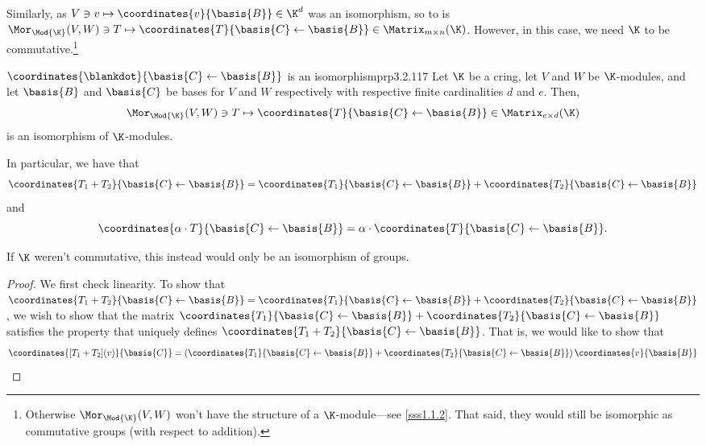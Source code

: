 Similarly, as $V\ni v\mapsto \coordinates{v}{\basis{B}}\in \K ^d$ was an isomorphism, so to is $\Mor _{\Mod{\K}}(V,W)\ni T\mapsto \coordinates{T}{\basis{C}\leftarrow \basis{B}}\in \Matrix _{m\times n}(\K )$.  However, in this case, we need $\K$ to be commutative.\footnote{Otherwise $\Mor _{\Mod{\K}}(V,W)$ won't have the structure of a $\K$-module---see \cref{sss1.1.2}.  That said, they would still be isomorphic as commutative groups (with respect to addition).}
\begin{prp}{$\coordinates{\blankdot}{\basis{C}\leftarrow \basis{B}}$ is an isomorphism}{prp3.2.117}
	Let $\K$ be a cring, let $V$ and $W$ be $\K$-modules, and let $\basis{B}$ and $\basis{C}$ be bases for $V$ and $W$ respectively with respective finite cardinalities $d$ and $e$.  Then,
	\begin{equation}
	\Mor _{\Mod{\K}}(V,W)\ni T\mapsto \coordinates{T}{\basis{C}\leftarrow \basis{B}}\in \Matrix _{e\times d}(\K )
	\end{equation}
	is an isomorphism of $\K$-modules.
	\begin{rmk}
		In particular, we have that
		\begin{equation}
		\coordinates{T_1+T_2}{\basis{C}\leftarrow \basis{B}}=\coordinates{T_1}{\basis{C}\leftarrow \basis{B}}+\coordinates{T_2}{\basis{C}\leftarrow \basis{B}}
		\end{equation}
		and
		\begin{equation}
		\coordinates{\alpha \cdot T}{\basis{C}\leftarrow \basis{B}}=\alpha \cdot \coordinates{T}{\basis{C}\leftarrow \basis{B}}.
		\end{equation}
	\end{rmk}
	\begin{rmk}
		If $\K$ weren't commutative, this instead would only be an isomorphism of groups.
	\end{rmk}
	\begin{proof}
		We first check linearity.  To show that $\coordinates{T_1+T_2}{\basis{C}\leftarrow \basis{B}}=\coordinates{T_1}{\basis{C}\leftarrow \basis{B}}+\coordinates{T_2}{\basis{C}\leftarrow \basis{B}}$, we wish to show that the matrix $\coordinates{T_1}{\basis{C}\leftarrow \basis{B}}+\coordinates{T_2}{\basis{C}\leftarrow \basis{B}}$ satisfies the property that uniquely defines $\coordinates{T_1+T_2}{\basis{C}\leftarrow \basis{B}}$.  That is, we would like to show that
		\begin{equation}
		\coordinates{[T_1+T_2](v)}{\basis{C}}=\left( \coordinates{T_1}{\basis{C}\leftarrow \basis{B}}+\coordinates{T_2}{\basis{C}\leftarrow \basis{B}}\right) \coordinates{v}{\basis{B}}

\end{equation}
\end{proof}
\end{prp}
